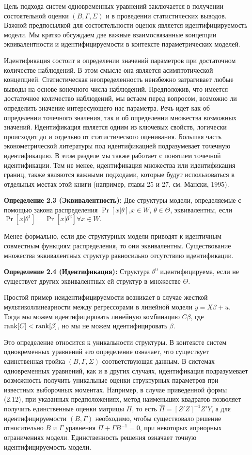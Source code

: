 Цель подхода систем одновременных уравнений заключается в получении состоятельной оценки $(B,\Gamma,\Sigma)$ и в проведении статистических выводов. Важной предпосылкой для состоятельности оценок является идентифицируемость модели. Мы кратко обсуждаем две важные  взаимосвязанные концепции  эквивалентности и идентифицируемости в контексте параметрических моделей.


Идентификация состоит в определении значений параметров при достаточном количестве наблюдений. В этом смысле она является асимптотической концепцией. Статистическая неопределенность неизбежно затрагивает любые выводы на основе конечного числа наблюдений. 
Предположив, что имеется достаточное количество наблюдений, мы встаем перед вопросом, возможно ли определить значение интересующего нас параметра. Речь идет как об определении точечного значения, так и об определении множества возможных  значений. 
Идентификация является одним из ключевых свойств, логически происходит до и отдельно от  статистического оценивания. Большая часть эконометрической литературы под идентификацией подразумевает точечную идентификацию. В этом разделе мы также работает с понятием точечной идентификации. Тем не менее, идентификация множества или идентификация границ, также являются важными подходами, которые будут использоваться в отдельных местах этой книги (например, главы 25 и 27, см. Мански, 1995).


{\bf Определение 2.3 (Эквивалентность):} Две структуры модели, определяемые с помощью закона распределения  $\Pr[x|\theta]$,$x\in W$, $\theta \in \Theta$,  эквивалентны, если $\Pr[x|\theta^{1}]=\Pr[x|\theta^{2}] \forall x \in W.$ 


Менее формально,  если две структурных  модели приводят к идентичным  совместным функциям   распределения, то они эквивалентны. Существование множества  эквивалентных структур равносильно отсутствию идентификации.

{\bf Определение 2.4 (Идентификация):} Структура $\theta^{0}$ идентифицируема, если не существует других эквивалентных ей структур в множестве $\Theta$.


Простой пример неидентифицируемости  возникает в случае жесткой мультиколлинеарности между регрессорами в линейной модели $y=X\beta+u$. Тогда мы можем идентифицировать линейную комбинацию $C\beta$, где $\mathrm{rank}[C] < \mathrm{rank}[\beta]$, но мы не можем идентифицировать $\beta$.


Это определение относится к уникальности структуры. В контексте систем одновременных уравнений  это определение означает, что существует единственная тройка $(B,\Gamma,\Sigma)$ соответствующая данным. 
В системах одновременных уравнений, как и в других случаях, идентификация подразумевает возможность получить уникальные оценки структурных параметров при известных выборочных моментах. Например, в случае приведенной формы (2.12), при указанных предположениях, метод наименьших квадратов позволяет получить единственные оценки матрицы $\Pi$, то есть $\hat{\Pi}=[Z'Z]^{-1}Z'Y$, а для идентифицируемости  $(B,\Gamma)$ необходимо, чтобы существовало решение относительно $B$ и $\Gamma$  уравнения $\Pi+\Gamma B^{-1}=0$, при некоторых  априорных ограничениях  модели. 
Единственность решения означает точную  идентифицируемость модели.

